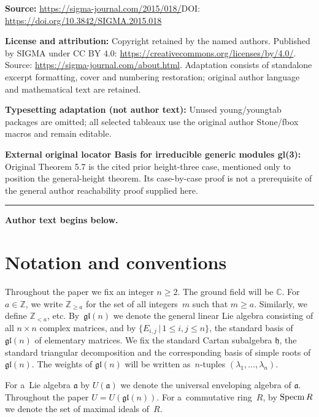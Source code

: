 \documentclass[11pt]{article}
\numberwithin{equation}{section}
\begin{document}
\noindent\textbf{Source:} \url{https://sigma-journal.com/2015/018/}\quad DOI: \url{https://doi.org/10.3842/SIGMA.2015.018}\par
\noindent\textbf{License and attribution:} Copyright retained by the named authors. Published by SIGMA under CC BY 4.0: \url{https://creativecommons.org/licenses/by/4.0/}. Source: \url{https://sigma-journal.com/about.html}. Adaptation consists of standalone excerpt formatting, cover and numbering restoration; original author language and mathematical text are retained.\par
\noindent\textbf{Typesetting adaptation (not author text):} Unused young/youngtab packages are omitted; all selected tableaux use the original author Stone/fbox macros and remain editable.\par
\noindent\textbf{External original locator Basis for irreducible generic modules gl(3):} Original Theorem 5.7 is the cited prior height-three case, mentioned only to position the general-height theorem. Its case-by-case proof is not a prerequisite of the general author reachability proof supplied here.\par
\medskip\hrule\medskip\noindent\textbf{Author text begins below.}\par
\setcounter{section}{1}
\setcounter{subsection}{0}
\setcounter{subsubsection}{0}
\setcounter{Theorem}{0}
\setcounter{equation}{0}
\section{Notation and conventions}

Throughout the paper we f\/ix an integer $n\geq 2$.
The ground f\/ield will be ${\mathbb C}$.
For $a \in {\mathbb Z}$, we write $\mathbb Z_{\geq a}$ for the set of all integers~$m$ such that $m \geq a$.
Similarly, we def\/ine $\mathbb Z_{< a}$, etc.
By~$\mathfrak{gl}(n)$ we denote the general linear Lie algebra consisting
of all $n\times n$ complex matrices, and by $\{E_{i,j}\,|\, 1\leq i,j \leq n\}$,
the standard basis of $\mathfrak{gl}(n)$ of elementary matrices.
We f\/ix the standard Cartan subalgebra $\mathfrak h$, the standard triangular decomposition and the corresponding basis
of simple roots of $\mathfrak{gl}(n)$.
The weights of $\mathfrak{gl}(n)$ will be written as~$n$-tuples $(\lambda_1,\dots,\lambda_n)$.

For a~Lie algebra ${\mathfrak a}$ by $U(\mathfrak a)$ we denote the universal enveloping algebra of ${\mathfrak a}$.
Throughout the paper $U = U(\mathfrak{gl} (n))$.
For a~commutative ring~$R$, by $\operatorname{Specm} R$ we denote the set of maximal ideals of~$R$.
\end{document}
